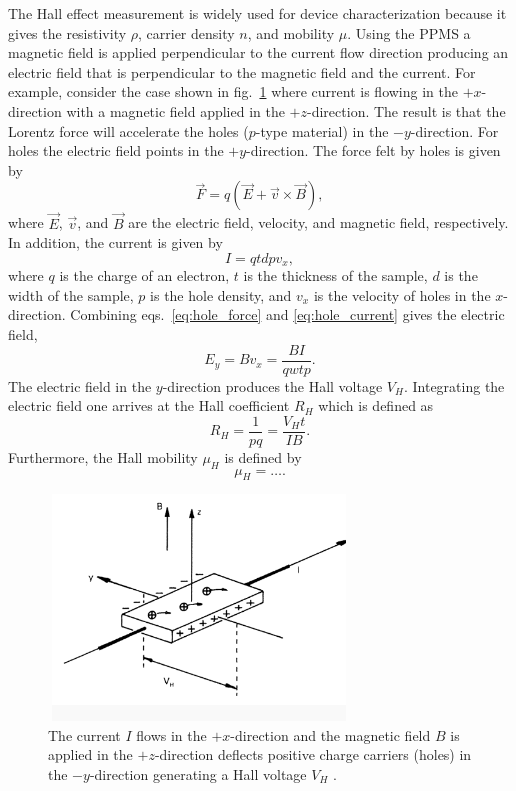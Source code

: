\noindent The Hall effect measurement is widely used for device characterization because it gives the resistivity $\rho$, carrier density $n$, and mobility $\mu$. Using the \acs{PPMS} a magnetic field is applied perpendicular to the current flow direction producing an electric field that is perpendicular to the magnetic field and the current. For example, consider the case shown in fig.~\ref{fig:hall_diagram} where current is flowing in the $+x$-direction with a magnetic field applied in the $+z$-direction. The result is that the Lorentz force will accelerate the holes ($p$-type material) in the $-y$-direction. For holes the electric field points in the $+y$-direction. The force felt by holes is given by
\begin{equation}\label{eq:hole_force}
	\vec{F} = q\left(\vec{E} + \vec{v}\times \vec{B}\right),
\end{equation}
where $\vec{E}$, $\vec{v}$, and $\vec{B}$ are the electric field, velocity, and magnetic field, respectively. In addition, the current is given by
\begin{equation}\label{eq:hole_current}
	I = q t d p v_x,
\end{equation}
where $q$ is the charge of an electron, $t$ is the thickness of the sample, $d$ is the width of the sample, $p$ is the hole density, and $v_x$ is the velocity of holes in the $x$-direction. Combining eqs.~\ref{eq:hole_force} and \ref{eq:hole_current} gives the electric field,
\begin{equation}\label{eq:efield}
	E_y = B v_x = \frac{B I}{q w t p}.
\end{equation}
The electric field in the $y$-direction produces the Hall voltage $V_H$. Integrating the electric field one arrives at the Hall coefficient $R_H$ which is defined as 
\begin{equation}\label{eq:hall_coeff}
	R_H = \frac{1}{p q} = \frac{V_H t}{I B}.
\end{equation}
Furthermore, the Hall mobility $\mu_H$ is defined by 
\begin{equation}\label{eq:mu_hall}
	\mu_H = \ldots.
\end{equation}
\begin{figure}[ht]
	\centering
	\includegraphics[height=6cm,width=8cm]{figs/results/hall_diagram}
	\caption[Hall effect measurement diagram]{The current $I$ flows in the $+x$-direction and the magnetic field $B$ is applied in the $+z$-direction deflects positive charge carriers (holes) in the $-y$-direction generating a Hall voltage $V_H$ \cite{HallDiagram,HallEffectNIST}.}
	\label{fig:hall_diagram}
\end{figure}